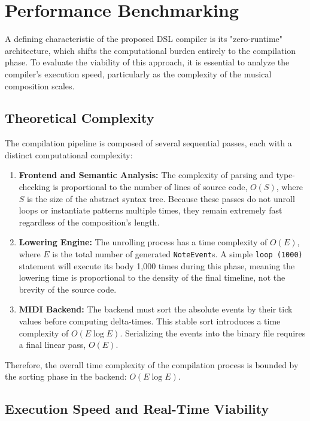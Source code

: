 \section{Performance Benchmarking}\label{sec:evaluation-benchmarking}

A defining characteristic of the proposed DSL compiler is its "zero-runtime" architecture, which shifts the
computational burden entirely to the compilation phase. To evaluate the viability of this approach, it is
essential to analyze the compiler's execution speed, particularly as the complexity of the musical composition scales.

\subsection{Theoretical Complexity}

The compilation pipeline is composed of several sequential passes, each with a distinct computational complexity:
\begin{enumerate}
  \item \textbf{Frontend and Semantic Analysis:} The complexity of parsing and type-checking is proportional
    to the number of lines of source code, $O(S)$, where $S$ is the size of the abstract syntax tree. Because
    these passes do not unroll loops or instantiate patterns multiple times, they remain extremely fast
    regardless of the composition's length.
  \item \textbf{Lowering Engine:} The unrolling process has a time complexity of $O(E)$, where $E$ is the
    total number of generated \texttt{NoteEvent}s. A simple \texttt{loop (1000)} statement will execute its
    body 1,000 times during this phase, meaning the lowering time is proportional to the density of the final
    timeline, not the brevity of the source code.
  \item \textbf{MIDI Backend:} The backend must sort the absolute events by their tick values before
    computing delta-times. This stable sort introduces a time complexity of $O(E \log E)$. Serializing the
    events into the binary file requires a final linear pass, $O(E)$.
\end{enumerate}
Therefore, the overall time complexity of the compilation process is bounded by the sorting phase in the
backend: $O(E \log E)$.

\subsection{Execution Speed and Real-Time Viability}

